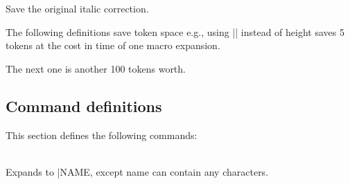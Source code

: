 %
\begin{macro}{\@dischyph}

\begin{teX}
\let\@dischyph=\-
\end{teX}
\end{macro}
%
  \begin{macro}{\@@italiccorr}
 Save the original italic correction.
\begin{teX}
\let\@@italiccorr=\/
\end{teX}
  \end{macro}
%
\begin{macro}{\@height}
\begin{macro}{\@depth}
\begin{macro}{\@width}
\begin{macro}{\@minus}

\begin{macro}{\@plus}


The following definitions save token space  e.g., using
|\@height| instead of height saves 5 tokens at the cost in time
of one macro expansion.
    
\begin{teX}
\def\@height{height} \def\@depth{depth} \def\@width{width}
\def\@minus{minus}
\def\@plus{plus}
\end{teX}
\begin{macro}{\hb@xt@}

The next one is another 100 tokens worth.

\begin{teX}
\def\hb@xt@{\hbox to}
\end{teX}
\end{macro}
\end{macro}
\end{macro}
\end{macro}
\end{macro}
\end{macro}

\begin{teX}
\end{teX}

 \subsection{Command definitions}

 This section defines the following commands:

 \DescribeMacro
  {\@namedef}\\ Expands to |\def\|\marg{NAME},
   except name can contain any characters.


